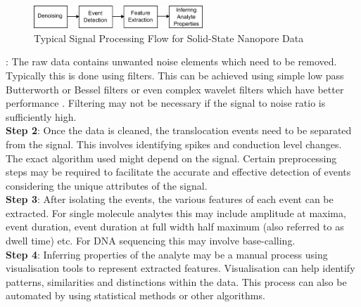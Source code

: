 \documentclass[journal]{IEEEtran}
\begin{document}
\begin{figure}[!t]
\centering
\includegraphics[width=2.5in]{TypSigFlow.png}
\caption{Typical Signal Processing Flow for Solid-State Nanopore Data}
\label{fig_1}
\end{figure}

: The raw data contains unwanted noise elements which need to be removed. Typically this is done using filters. This can be achieved using simple low pass Butterworth or Bessel filters or even complex wavelet filters which have better performance \cite{shekarWaveletDenoisingHighBandwidth2019}. Filtering may not be necessary if the signal to noise ratio is sufficiently high. \\
{\bf{Step 2}}: Once the data is cleaned, the translocation events need to be separated from the signal. This involves identifying spikes and conduction level changes. The exact algorithm used might depend on the signal. Certain preprocessing steps may be required to facilitate the accurate and effective detection of events considering the unique attributes of the signal. \\
{\bf{Step 3}}: After isolating the events, the various features of each event can be extracted. For single molecule analytes this may include amplitude at maxima, event duration, event duration at full width half maximum (also referred to as dwell time) etc. For DNA sequencing this may involve base-calling. \\
{\bf{Step 4}}: Inferring properties of the analyte may be a manual process using visualisation tools to represent extracted features. Visualisation can help identify patterns, similarities and distinctions within the data. This process can also be automated by using statistical methods or other algorithms.
\end{document}
